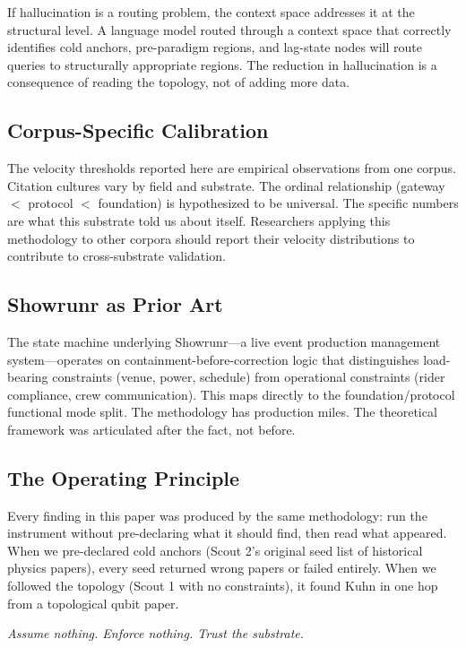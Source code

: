 \documentclass[11pt]{article}
\begin{document}
If hallucination is a routing problem, the context space addresses it at the structural level. A language model routed through a context space that correctly identifies cold anchors, pre-paradigm regions, and lag-state nodes will route queries to structurally appropriate regions. The reduction in hallucination is a consequence of reading the topology, not of adding more data.

\subsection{Corpus-Specific Calibration}

The velocity thresholds reported here are empirical observations from one corpus. Citation cultures vary by field and substrate. The ordinal relationship (gateway $<$ protocol $<$ foundation) is hypothesized to be universal. The specific numbers are what this substrate told us about itself. Researchers applying this methodology to other corpora should report their velocity distributions to contribute to cross-substrate validation.

\subsection{Showrunr as Prior Art}

The state machine underlying Showrunr---a live event production management system---operates on containment-before-correction logic that distinguishes load-bearing constraints (venue, power, schedule) from operational constraints (rider compliance, crew communication). This maps directly to the foundation/protocol functional mode split. The methodology has production miles. The theoretical framework was articulated after the fact, not before.

\subsection{The Operating Principle}

Every finding in this paper was produced by the same methodology: run the instrument without pre-declaring what it should find, then read what appeared. When we pre-declared cold anchors (Scout 2's original seed list of historical physics papers), every seed returned wrong papers or failed entirely. When we followed the topology (Scout 1 with no constraints), it found Kuhn in one hop from a topological qubit paper.

\textit{Assume nothing. Enforce nothing. Trust the substrate.}
\end{document}
